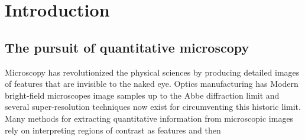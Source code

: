 \chapter{Introduction}
\label{ch:intro}









\section{The pursuit of quantitative microscopy}

Microscopy has revolutionized the physical sciences by producing
detailed images of features that are invisible to the naked eye.
Optics manufacturing has 
Modern bright-field microscopes image samples up to the
Abbe diffraction limit \cite{abbe1873}
and several super-resolution techniques now exist for
circumventing this historic limit.
Many methods for extracting
quantitative information from microscopic images rely
on interpreting regions of contrast as features and
then 


